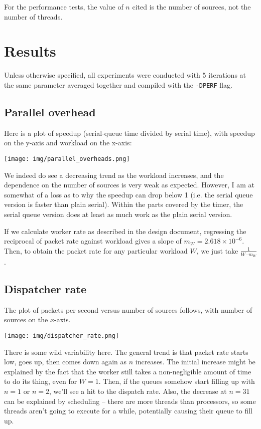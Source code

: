 \documentclass{article}
\begin{document}
For the performance tests, the value of $n$ cited is the number of sources, not the number of threads. 
\section*{Results}
Unless otherwise specified, all experiments were conducted with 5 iterations at the same parameter averaged together and compiled with the \verb|-DPERF| flag.
\subsection*{Parallel overhead}
Here is a plot of speedup (serial-queue time divided by serial time), with speedup on the y-axis and workload on the x-axis:

\texttt{[image: img/parallel\_overheads.png]}

We indeed do see a decreasing trend as the workload increases, and the dependence on the number of sources is very weak as expected. However, I am at somewhat of a loss as to why the speedup can drop below 1 (i.e. the serial queue version is faster than plain serial). Within the parts covered by the timer, the serial queue version does at least as much work as the plain serial version. 

If we calculate worker rate as described in the design document, regressing the reciprocal of packet rate against workload gives a slope of $m_W=2.618\times10^{-6}$. Then, to obtain the packet rate for any particular workload $W$, we just take $\frac{1}{W\cdot m_W}$.
\subsection*{Dispatcher rate}
The plot of packets per second versus number of sources follows, with number of sources on the $x$-axis.

\texttt{[image: img/dispatcher\_rate.png]}

There is some wild variability here. The general trend is that packet rate starts low, goes up, then comes down again as $n$ increases. The initial increase might be explained by the fact that the worker still takes a non-negligible amount of time to do its thing, even for $W=1$. Then, if the queues somehow start filling up with $n=1$ or $n=2$, we'll see a hit to the dispatch rate. Also, the decrease at $n=31$ can be explained by scheduling -- there are more threads than processors, so some threads aren't going to execute for a while, potentially causing their queue to fill up.
\end{document}
